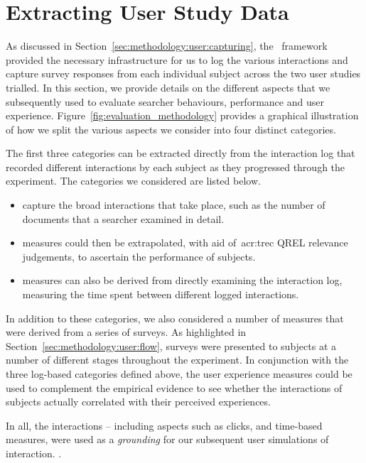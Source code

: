 \section{Extracting User Study Data}\label{sec:methodology:extracting}
As discussed in Section~\ref{sec:methodology:user:capturing}, the \treconomics~framework provided the necessary infrastructure for us to log the various interactions and capture survey responses from each individual subject across the two user studies trialled. In this section, we provide details on the different aspects that we subsequently used to evaluate searcher behaviours, performance and user experience. Figure~\ref{fig:evaluation_methodology} provides a graphical illustration of how we split the various aspects we consider into four distinct categories.

The first three categories can be extracted directly from the interaction log that recorded different interactions by each subject as they progressed through the experiment. The categories we considered are listed below.

\begin{itemize}
    
    \item{ capture the broad interactions that take place, such as the number of documents that a searcher examined in detail.}
    \item{ measures could then be extrapolated, with aid of~\gls{acr:trec} QREL relevance judgements, to ascertain the performance of subjects.}
    \item{ measures can also be derived from directly examining the interaction log, measuring the time spent between different logged interactions.}
    
\end{itemize}

In addition to these categories, we also considered a number of  measures that were derived from a series of surveys. As highlighted in Section~\ref{sec:methodology:user:flow}, surveys were presented to subjects at a number of different stages throughout the experiment. In conjunction with the three log-based categories defined above, the user experience measures could be used to complement the empirical evidence to see whether the interactions of subjects actually correlated with their perceived experiences.

In all, the interactions -- including aspects such as clicks, and time-based measures, were used as a \emph{grounding} for our subsequent user simulations of interaction. .

